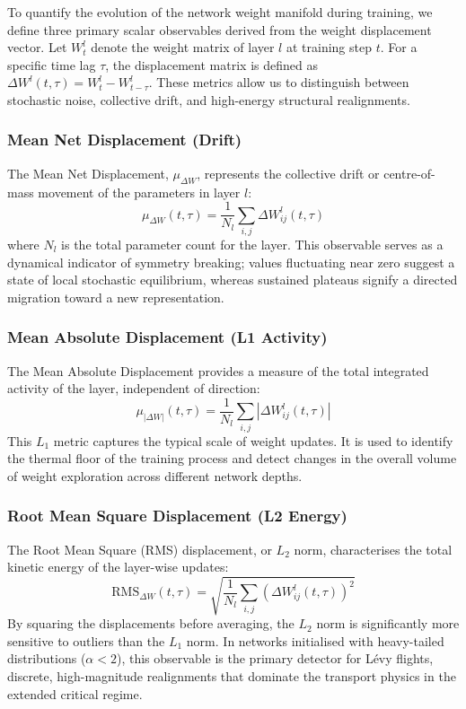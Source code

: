\documentclass[11pt,a4paper]{article}
\begin{document}
To quantify the evolution of the network weight manifold during training, we define three primary scalar observables derived from the weight displacement vector. Let $W^l_t$ denote the weight matrix of layer $l$ at training step $t$. For a specific time lag $\tau$, the displacement matrix is defined as $\Delta W^l(t, \tau) = W^l_t - W^l_{t-\tau}$. These metrics allow us to distinguish between stochastic noise, collective drift, and high-energy structural realignments.

\subsubsection{Mean Net Displacement (Drift)}
The Mean Net Displacement, $\mu_{\Delta W}$, represents the collective drift or centre-of-mass movement of the parameters in layer $l$:
\begin{equation}
    \mu_{\Delta W}(t, \tau) = \frac{1}{N_l} \sum_{i,j} \Delta W^l_{ij}(t, \tau)
\end{equation}
where $N_l$ is the total parameter count for the layer. This observable serves as a dynamical indicator of symmetry breaking; values fluctuating near zero suggest a state of local stochastic equilibrium, whereas sustained plateaus signify a directed migration toward a new representation.

\subsubsection{Mean Absolute Displacement (L1 Activity)}
The Mean Absolute Displacement provides a measure of the total integrated activity of the layer, independent of direction:
\begin{equation}
    \mu_{|\Delta W|}(t, \tau) = \frac{1}{N_l} \sum_{i,j} |\Delta W^l_{ij}(t, \tau)|
\end{equation}
This $L_1$ metric captures the typical scale of weight updates. It is used to identify the thermal floor of the training process and detect changes in the overall volume of weight exploration across different network depths.

\subsubsection{Root Mean Square Displacement (L2 Energy)}
The Root Mean Square (RMS) displacement, or $L_2$ norm, characterises the total kinetic energy of the layer-wise updates:
\begin{equation}
    \text{RMS}_{\Delta W}(t, \tau) = \sqrt{\frac{1}{N_l} \sum_{i,j} \left( \Delta W^l_{ij}(t, \tau) \right)^2}
\end{equation}
By squaring the displacements before averaging, the $L_2$ norm is significantly more sensitive to outliers than the $L_1$ norm. In networks initialised with heavy-tailed distributions ($\alpha < 2$), this observable is the primary detector for Lévy flights, discrete, high-magnitude realignments that dominate the transport physics in the extended critical regime.
\end{document}
